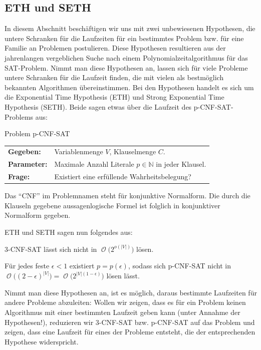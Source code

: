 \documentclass[a4paper,ngerman]{atseminar}
\newcommand{\N}{\ensuremath{\mathbb{N}}\xspace}
\newcommand{\BigO}[1]{\ensuremath{\operatorname{\mathcal{O}}\bigl(#1\bigr)}\xspace}
\begin{document}
\subsection{ETH und SETH}

In diesem Abschnitt beschäftigen wir uns mit zwei unbewiesenen Hypothesen, die untere Schranken für die Laufzeiten für ein bestimmtes Problem bzw. für eine
Familie an Problemen postulieren.
Diese Hypothesen resultieren aus der jahrenlangen vergeblichen Suche nach einem Polynomialzeitalgorithmus für das SAT-Problem.
Nimmt man diese Hypothesen an, lassen sich für viele Probleme untere Schranken für die Laufzeit finden, die mit vielen als bestmöglich bekannten Algorithmen übereinstimmen.
\noindent
Bei den Hypothesen handelt es sich um die Exponential Time Hypothesis (ETH) und Strong Exponential Time Hypothesis (SETH). Beide sagen etwas über die
Laufzeit des p-\textsc{CNF-SAT}-Problems aus:

\begin{definition}{Problem p-\textsc{CNF-SAT}}
  \\
  \begin{tabular}{ll}
    \textbf{Gegeben:} & Variablenmenge $V$, Klauselmenge $C$. \\
    \textbf{Parameter:} & Maximale Anzahl Literale $p \in \N$ in jeder Klausel. \\
    \textbf{Frage:} & Existiert eine erfüllende Wahrheitsbelegung?
  \end{tabular}
\end{definition}

\noindent
Das \enquote{CNF} im Problemnamen steht für konjunktive Normalform. Die durch die Klauseln gegebene aussagenlogische Formel ist folglich in konjunktiver Normalform gegeben.

\noindent
ETH und SETH sagen nun folgendes aus:

\begin{definition}
  \label{oe:definition:eth}
  3-\textsc{CNF-SAT} lässt sich nicht in \BigO{2^{o(|V|)}} lösen.
\end{definition}

\begin{definition}
  Für jedes feste $\epsilon < 1$ existiert $p = p(\epsilon)$, sodass sich p-\textsc{CNF-SAT} nicht in $\BigO{(2 - \epsilon)^{|V|}} = \BigO{2^{|V|(1 - \epsilon)}}$ lösen lässt.
\end{definition}
  
\noindent
Nimmt man diese Hypothesen an, ist es möglich, daraus bestimmte Laufzeiten für andere Probleme abzuleiten: Wollen wir zeigen, dass es für ein Problem keinen Algorithmus mit einer bestimmten Laufzeit geben kann
(unter Annahme der Hypothesen!), reduzieren wir 3-\textsc{CNF-SAT} bzw. p-\textsc{CNF-SAT} auf das Problem und zeigen, dass eine Laufzeit für eines der Probleme
entsteht, die der entsprechenden Hypothese widerspricht.
\end{document}
